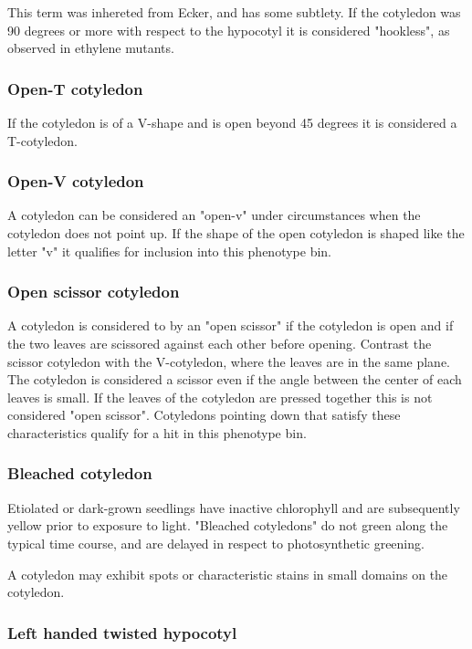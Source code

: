 This term was inhereted from Ecker, and has some subtlety. If the cotyledon was 90 degrees or more with respect to the hypocotyl it is considered "hookless", as observed in ethylene mutants. %

\subsubsection{Open-T cotyledon}

If the cotyledon is of a V-shape and is open beyond 45 degrees it is considered a T-cotyledon.

\subsubsection{Open-V cotyledon}

A cotyledon can be considered an "open-v" under circumstances when the cotyledon does not point up. If the shape of the open cotyledon is shaped like the letter "v" it qualifies for inclusion into this phenotype bin.

\subsubsection{Open scissor cotyledon}
A cotyledon is considered to by an "open scissor" if the cotyledon is open and if the two leaves are scissored against each other before opening. Contrast the scissor cotyledon with the V-cotyledon, where the leaves are in the same plane. The cotyledon is considered a scissor even if the angle between the center of each leaves is small. If the leaves of the cotyledon are pressed together this is not considered "open scissor". Cotyledons pointing down that satisfy these characteristics qualify for a hit in this phenotype bin.

\subsubsection{Bleached cotyledon}

Etiolated or dark-grown seedlings have inactive chlorophyll and are subsequently yellow prior to exposure to light. "Bleached cotyledons" do not green along the typical time course, and are delayed in respect to photosynthetic greening.


A cotyledon may exhibit spots or characteristic stains in small domains on the cotyledon.

\subsubsection{Left handed twisted hypocotyl}

